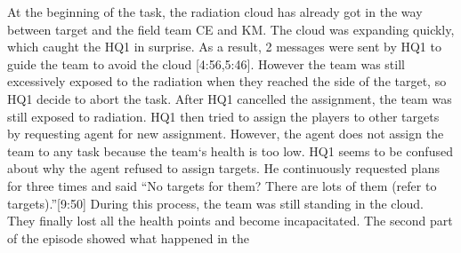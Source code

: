 At the beginning of the task, the radiation cloud has already got in the way between target and the field team CE and KM. The cloud was expanding quickly, which caught the HQ1 in surprise. As a result, 2 messages were sent by HQ1 to guide the team to avoid the cloud [4:56,5:46]. However the team was still excessively exposed to the radiation when they reached the side of the target, so HQ1 decide to abort the task. After HQ1 cancelled the assignment, the team was still exposed to radiation. HQ1 then tried to assign the players to other targets by requesting agent for new assignment. However, the agent does not assign the team to any task because the team`s health is too low. HQ1 seems to be confused about why the agent refused to assign targets. He continuously requested plans for three times and said ``No targets for them? There are lots of them (refer to targets).''[9:50] During this process, the team was still standing in the cloud. They finally lost all the health points and become incapacitated. The second part of the episode showed what happened in the \\


\noindent{}

